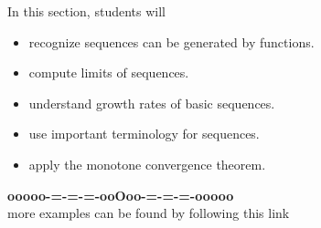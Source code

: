 \documentclass{ximera}
\begin{document}
\begin{sectionOutcomes}

In this section, students will

\begin{itemize}
\item{recognize sequences can be generated by functions.}
\item{compute limits of sequences.}
\item{understand growth rates of basic sequences.}
\item{use important terminology for sequences.}
\item{apply the monotone convergence theorem.}
\end{itemize}

\end{sectionOutcomes}















\begin{center}
\textbf{\textcolor{green!50!black}{ooooo-=-=-=-ooOoo-=-=-=-ooooo}} \\

more examples can be found by following this link\\ 

\end{center}
\end{document}
